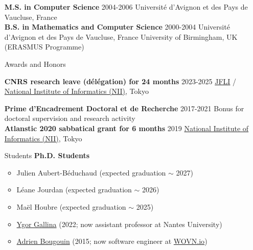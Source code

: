 \documentclass[11pt,a4paper]{article}
\begin{document}
\begin{itemize}
\textbf{M.S. in Computer Science} \hfill 2004-2006 \newline 
Université d'Avignon et des Pays de Vaucluse, France \\[-.5cm]
                    
\textbf{B.S. in Mathematics and Computer Science} \hfill 2000-2004 \newline
Université d'Avignon et des Pays de Vaucluse, France \newline
University of Birmingham, UK (ERASMUS Programme)

\item[Awards and Honors]

\textbf{CNRS research leave (délégation) for 24 months} \hfill 2023-2025 \newline
\href{https://jfli.cnrs.fr/}{JFLI} /
\href{https://www.nii.ac.jp/en/}{National Institute of Informatics (NII)}, Tokyo

\textbf{Prime d'Encadrement Doctoral et de Recherche} \hfill 2017-2021 \newline
Bonus for doctoral supervision and research activity \\[-.5cm]

\textbf{Atlanstic 2020 sabbatical grant for 6 months} \hfill 2019 \newline
\href{https://www.nii.ac.jp/en/}{National Institute of Informatics (NII)}, Tokyo




\item[Students]
\textbf{Ph.D. Students}
\begin{itemize}[nosep,topsep=-0.2cm,leftmargin=!,labelsep*=.3cm,label=$\Yright$]
\item Julien Aubert-Béduchaud (expected graduation $\sim$ 2027) 
\item Léane Jourdan (expected graduation $\sim$ 2026) 
\item Maël Houbre (expected graduation $\sim$ 2025)
\item \href{https://github.com/ygorg}{Ygor Gallina}
      (2022; now assistant professor at Nantes University) 
\item \href{http://adrien-bougouin.github.io/}{Adrien Bougouin} 
      (2015; now software engineer at \href{https://wovn.io/}{WOVN.io}) 
\end{itemize}~\\[-.2cm]
%


\end{itemize}
\end{document}
